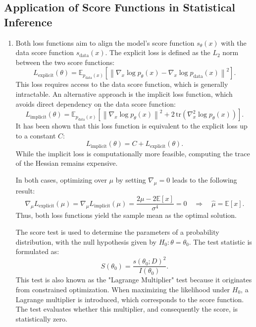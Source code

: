 \documentclass{article}
\begin{document}
\subsection{Application of Score Functions in Statistical Inference}
\begin{enumerate}
    \item 
Both loss functions aim to align the model's score function $s_{\theta}(x)$ with the data score function $s_{\text{data}}(x)$. The explicit loss is defined as the $L_2$ norm between the two score functions:
\begin{equation*}
    L_{\text{explicit}}(\theta) = \mathbb{E}_{p_{\text{data}}(x)} \left[ \left\| \nabla_x \log p_{\theta}(x) - \nabla_x \log p_{\text{data}}(x) \right\|^2 \right].
\end{equation*}
This loss requires access to the data score function, which is generally intractable. An alternative approach is the implicit loss function, which avoids direct dependency on the data score function:
\begin{equation*}
    L_{\text{implicit}}(\theta) = \mathbb{E}_{p_{\text{data}}(x)} \left[ \left\| \nabla_x \log p_{\theta}(x) \right\|^2 + 2\, \text{tr} ( \nabla^2_x \log p_{\theta}(x) ) \right].
\end{equation*}
It has been shown that this loss function is equivalent to the explicit loss up to a constant $C$:
\begin{equation*}
    L_{\text{implicit}}(\theta) = C + L_{\text{explicit}}(\theta).
\end{equation*}
While the implicit loss is computationally more feasible, computing the trace of the Hessian remains expensive.

In both cases, optimizing over $\mu$ by setting $\nabla_{\mu} = 0$ leads to the following result:
\begin{equation*}
    \nabla_{\mu} L_{\text{explicit}}(\mu) = \nabla_{\mu} L_{\text{implicit}}(\mu) = \frac{2\mu - 2\mathbb{E}[x]}{\sigma^4} = 0 \quad \Rightarrow \quad \hat{\mu} = \mathbb{E}[x].
\end{equation*}
Thus, both loss functions yield the sample mean as the optimal solution.

The score test is used to determine the parameters of a probability distribution, with the null hypothesis given by $H_0: \theta = \theta_0$. The test statistic is formulated as:
\begin{equation*}
    S(\theta_0) = \frac{s(\theta_0; D)^2}{I(\theta_0)}.
\end{equation*}
This test is also known as the "Lagrange Multiplier" test because it originates from constrained optimization. When maximizing the likelihood under $H_0$, a Lagrange multiplier is introduced, which corresponds to the score function. The test evaluates whether this multiplier, and consequently the score, is statistically zero.


\end{enumerate}
\end{document}
